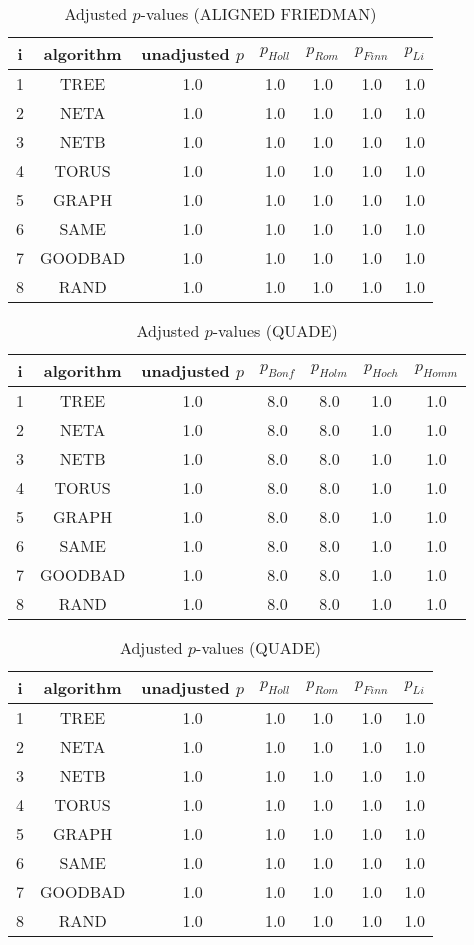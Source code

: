 \documentclass[a4paper,10pt]{article}
\begin{document}
\begin{landscape}
\begin{table}[!htp]
\centering\scriptsize
\caption{Adjusted $p$-values (ALIGNED FRIEDMAN)}
\begin{tabular}{ccccccc}
i&algorithm&unadjusted $p$&$p_{Holl}$&$p_{Rom}$&$p_{Finn}$&$p_{Li}$\\
\hline
1& TREE&1.0&1.0&1.0&1.0&1.0\\
2& NETA&1.0&1.0&1.0&1.0&1.0\\
3& NETB&1.0&1.0&1.0&1.0&1.0\\
4& TORUS&1.0&1.0&1.0&1.0&1.0\\
5& GRAPH&1.0&1.0&1.0&1.0&1.0\\
6& SAME&1.0&1.0&1.0&1.0&1.0\\
7& GOODBAD&1.0&1.0&1.0&1.0&1.0\\
8& RAND&1.0&1.0&1.0&1.0&1.0\\
\hline
\end{tabular}
\end{table}


\newpage

\begin{table}[!htp]
\centering\scriptsize
\caption{Adjusted $p$-values (QUADE)}
\begin{tabular}{ccccccc}
i&algorithm&unadjusted $p$&$p_{Bonf}$&$p_{Holm}$&$p_{Hoch}$&$p_{Homm}$\\
\hline
1& TREE&1.0&8.0&8.0&1.0&1.0\\
2& NETA&1.0&8.0&8.0&1.0&1.0\\
3& NETB&1.0&8.0&8.0&1.0&1.0\\
4& TORUS&1.0&8.0&8.0&1.0&1.0\\
5& GRAPH&1.0&8.0&8.0&1.0&1.0\\
6& SAME&1.0&8.0&8.0&1.0&1.0\\
7& GOODBAD&1.0&8.0&8.0&1.0&1.0\\
8& RAND&1.0&8.0&8.0&1.0&1.0\\
\hline
\end{tabular}
\end{table}

\begin{table}[!htp]
\centering\scriptsize
\caption{Adjusted $p$-values (QUADE)}
\begin{tabular}{ccccccc}
i&algorithm&unadjusted $p$&$p_{Holl}$&$p_{Rom}$&$p_{Finn}$&$p_{Li}$\\
\hline
1& TREE&1.0&1.0&1.0&1.0&1.0\\
2& NETA&1.0&1.0&1.0&1.0&1.0\\
3& NETB&1.0&1.0&1.0&1.0&1.0\\
4& TORUS&1.0&1.0&1.0&1.0&1.0\\
5& GRAPH&1.0&1.0&1.0&1.0&1.0\\
6& SAME&1.0&1.0&1.0&1.0&1.0\\
7& GOODBAD&1.0&1.0&1.0&1.0&1.0\\
8& RAND&1.0&1.0&1.0&1.0&1.0\\
\hline
\end{tabular}
\end{table}

\end{landscape}
\end{document}

